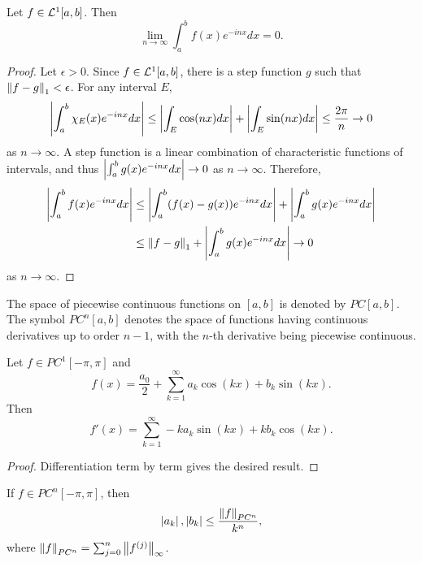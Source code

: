 \begin{lemma}
    Let $f\in \mathcal{L}^1[a,b]$. Then 
    \begin{equation*}
        \lim_{n\to\infty} \int_a^b f(x)e^{-inx}dx = 0.
    \end{equation*}
\end{lemma}
\begin{proof}
    Let $\epsilon > 0$. Since $f\in\mathcal{L}^1[a,b]$, there is a step function 
    $g$ such that $\left\lVert {f-g} \right\rVert_1 < \epsilon$. For any interval $E$, 
    \begin{equation*}
        \left\lvert {\int_a^b \chi_E(x)e^{-inx}dx} \right\rvert \leq \left\lvert {\int_E \cos(nx)dx} \right\rvert + \left\lvert {\int_E \sin(nx)dx} \right\rvert 
        \leq \frac{2\pi}{n} \to 0
    \end{equation*}
    as $n\to\infty$. A step function is a linear combination of characteristic 
    functions of intervals, and thus $\left\lvert {\int_a^b g(x)e^{-inx}dx} \right\rvert \to 0$ as $n\to\infty$.
    Therefore, 
    \begin{equation*}
        \begin{split}
            \left\lvert {\int_a^b f(x)e^{-inx}dx} \right\rvert &\leq \left\lvert {\int_a^b (f(x)-g(x))e^{-inx}dx} \right\rvert + \left\lvert {\int_a^b g(x)e^{-inx}dx} \right\rvert \\
            &\leq \left\lVert {f-g} \right\rVert_1 + \left\lvert {\int_a^b g(x)e^{-inx}dx} \right\rvert \to 0
        \end{split}
    \end{equation*}
    as $n\to\infty$.
\end{proof}

\begin{definition}
    The space of piecewise continuous functions on $[a,b]$ is denoted by $PC[a,b]$. 
    The symbol $PC^n[a,b]$ denotes the space of functions having continuous derivatives up to order $n-1$, 
    with the $n$-th derivative being piecewise continuous.
\end{definition}

\begin{proposition}
    Let $f\in PC^1[-\pi,\pi]$ and 
    \begin{equation*}
        f(x) = \frac{a_0}{2} + \sum_{k=1}^\infty a_k \cos(kx) + b_k \sin(kx).
    \end{equation*}
    Then 
    \begin{equation*}
        f'(x) = \sum_{k=1}^\infty -ka_k \sin(kx) + kb_k \cos(kx).
    \end{equation*}
\end{proposition}
\begin{proof}
    Differentiation term by term gives the desired result.
\end{proof}
\begin{remark}
    If $f\in PC^n[-\pi,\pi]$, then
    \begin{equation*}
        \left\lvert {a_k} \right\rvert, \left\lvert {b_k} \right\rvert \leq \frac{\left\lVert {f} \right\rVert_{PC^n}}{k^n},
    \end{equation*}
    where $\left\lVert {f} \right\rVert_{PC^n} = \sum_{j=0}^n \left\lVert {f^{(j)}} \right\rVert_\infty$.
\end{remark}

